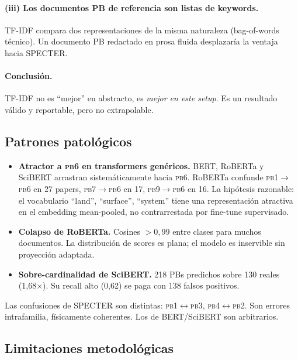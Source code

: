 \documentclass[11pt,a4paper]{article}
\newcommand{\pb}[1]{\textsc{pb#1}}
\begin{document}
\paragraph{(iii) Los documentos PB de referencia son listas de keywords.} TF-IDF compara dos representaciones de la misma naturaleza (bag-of-words técnico). Un documento PB redactado en prosa fluida desplazaría la ventaja hacia SPECTER.

\paragraph{Conclusión.} TF-IDF no es ``mejor'' en abstracto, es \emph{mejor en este setup}. Es un resultado válido y reportable, pero no extrapolable.

\subsection{Patrones patológicos}

\begin{itemize}
\item \textbf{Atractor a \pb6 en transformers genéricos.} BERT, RoBERTa y SciBERT arrastran sistemáticamente hacia \pb6. RoBERTa confunde \pb1$\to$\pb6 en 27 papers, \pb7$\to$\pb6 en 17, \pb9$\to$\pb6 en 16. La hipótesis razonable: el vocabulario ``land'', ``surface'', ``system'' tiene una representación atractiva en el embedding mean-pooled, no contrarrestada por fine-tune supervisado.
\item \textbf{Colapso de RoBERTa.} Cosines $>0{,}99$ entre clases para muchos documentos. La distribución de scores es plana; el modelo es inservible sin proyección adaptada.
\item \textbf{Sobre-cardinalidad de SciBERT.} 218 PBs predichos sobre 130 reales (1{,}68$\times$). Su recall alto (0{,}62) se paga con 138 falsos positivos.
\end{itemize}

Las confusiones de SPECTER son distintas: \pb1$\leftrightarrow$\pb3, \pb4$\leftrightarrow$\pb2. Son errores intrafamilia, físicamente coherentes. Los de BERT/SciBERT son arbitrarios.

\subsection{Limitaciones metodológicas}
\end{document}

